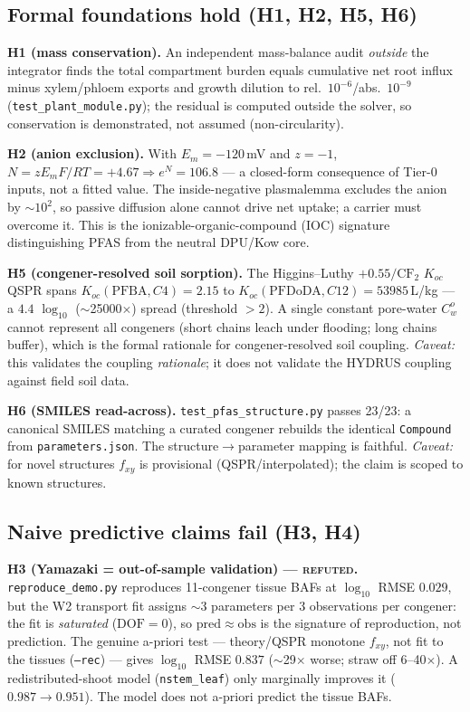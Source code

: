 \documentclass[11pt]{article}
\begin{document}
\subsection{Formal foundations hold (H1, H2, H5, H6)}

\textbf{H1 (mass conservation).} An independent mass-balance audit
\emph{outside} the integrator finds the total compartment burden
equals cumulative net root influx minus xylem/phloem exports and
growth dilution to rel.\ $10^{-6}$/abs.\ $10^{-9}$
(\texttt{test\_plant\_module.py}); the residual is computed outside the
solver, so conservation is demonstrated, not assumed
(non-circularity).

\textbf{H2 (anion exclusion).} With $E_m=-120$\,mV and $z=-1$,
$N=zE_mF/RT=+4.67\Rightarrow e^{N}=106.8$ --- a closed-form
consequence of Tier-0 inputs, not a fitted value. The inside-negative
plasmalemma excludes the anion by $\sim$$10^2$, so passive diffusion
alone cannot drive net uptake; a carrier must overcome it. This is the
ionizable-organic-compound (IOC) signature distinguishing PFAS from
the neutral DPU/Kow core.

\textbf{H5 (congener-resolved soil sorption).} The Higgins--Luthy
$+0.55/\mathrm{CF_2}$ $K_{oc}$ QSPR spans
$K_{oc}(\mathrm{PFBA},C4){=}2.15$ to
$K_{oc}(\mathrm{PFDoDA},C12){=}53985$\,L/kg --- a $4.4$ $\log_{10}$
($\sim$25000$\times$) spread (threshold $>2$). A single constant
pore-water $C_w^o$ cannot represent all congeners (short chains leach
under flooding; long chains buffer), which is the formal rationale for
congener-resolved soil coupling. \emph{Caveat:} this validates the
coupling \emph{rationale}; it does not validate the HYDRUS coupling
against field soil data.

\textbf{H6 (SMILES read-across).} \texttt{test\_pfas\_structure.py}
passes 23/23: a canonical SMILES matching a curated congener rebuilds
the identical \texttt{Compound} from \texttt{parameters.json}. The
structure$\to$parameter mapping is faithful. \emph{Caveat:} for novel
structures $f_{xy}$ is provisional (QSPR/interpolated); the claim is
scoped to known structures.

\subsection{Naive predictive claims fail (H3, H4)}

\textbf{H3 (Yamazaki = out-of-sample validation) --- \textsc{refuted}.}
\texttt{reproduce\_demo.py} reproduces 11-congener tissue BAFs at
$\log_{10}$ RMSE $0.029$, but the W2 transport fit assigns $\sim$3
parameters per 3 observations per congener: the fit is
\emph{saturated} ($\mathrm{DOF}=0$), so $\mathrm{pred}\approx
\mathrm{obs}$ is the signature of reproduction, not prediction. The
genuine a-priori test --- theory/QSPR monotone $f_{xy}$, not fit to the
tissues (\texttt{--rec}) --- gives $\log_{10}$ RMSE $0.837$ ($\sim$29$\times$
worse; straw off 6--40$\times$). A redistributed-shoot model
(\texttt{nstem\_leaf}) only marginally improves it
($0.987\!\to\!0.951$). The model does not a-priori predict the tissue
BAFs.
\end{document}
